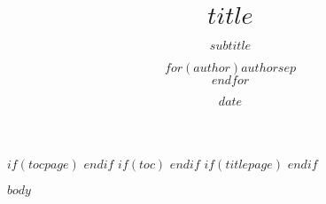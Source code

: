 \documentclass[a4paper, 10pt]{jsarticle}
\title{$title$}
\subtitle{$subtitle$}
\author{$for(author)$$author$$sep$\\$endfor$}
\date{$date$}
\begin{document}
\maketitle
$if(tocpage)$
\newpage
$endif$
$if(toc)$
\tableofcontents
$endif$
$if(titlepage)$
\newpage
$endif$

\makeatletter
\pagestyle{fancy}
\cfoot{\small{\thepage{}/{}\protect\pageref*{LastPage}}}
\renewcommand{\headrulewidth}{0pt}
\renewcommand{\footrulewidth}{0pt}
\makeatother


$body$
\end{document}
